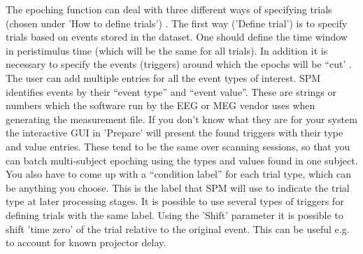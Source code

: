 The epoching function can deal with three different ways of specifying trials (chosen under 'How to define trials') . The first way ('Define trial') is to specify trials based on events stored in the dataset. One should define the time window in peristimulus time (which will be the same for all trials). In addition it is necessary to specify the events (triggers) around which the epochs will be ``cut' . The user can add multiple entries for all the event types of interest. SPM identifies events by their ``event type'' and ``event value''. These are strings or numbers which the software run by the EEG or MEG vendor uses when generating the measurement file. If you don't know what they are for your system the interactive GUI in 'Prepare' will present the found triggers with their type and value entries. These tend to be the same over scanning sessions, so that you can batch multi-subject epoching using the types and values found in one subject. You also have to come up with a ``condition label'' for each trial type, which can be anything you choose. This is the label that SPM will use to indicate the trial type at later processing stages. It is possible to use several types of triggers for defining trials with the same label. Using the 'Shift' parameter it is possible to shift 'time zero' of the trial relative to the original event. This can be useful e.g. to account for known projector delay. 

